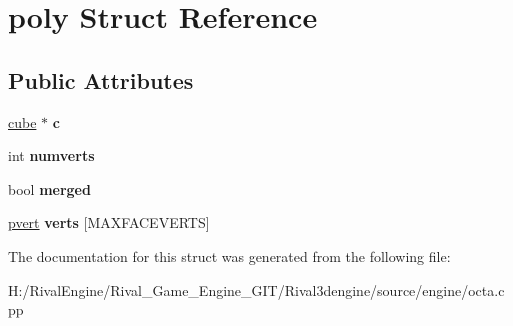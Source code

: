 \hypertarget{structpoly}{}\section{poly Struct Reference}
\label{structpoly}
\subsection*{Public Attributes}
\begin{DoxyCompactItemize}
\item 
\mbox{\label{structpoly_a7509e8ef1a174ba9f856f6c9c8ba434b}} 
\hyperlink{structcube}{cube} $\ast$ {\bfseries c}
\item 
\mbox{\label{structpoly_a4d664289d0ca98193bb3ee07a4394c7f}} 
int {\bfseries numverts}
\item 
\mbox{\label{structpoly_a8abff76cf1cf2d47c0f0f1adfe8484b1}} 
bool {\bfseries merged}
\item 
\mbox{\label{structpoly_ad6c8d6b50a39df917ef46a81a343ec71}} 
\hyperlink{structpvert}{pvert} {\bfseries verts} \mbox{[}M\+A\+X\+F\+A\+C\+E\+V\+E\+R\+TS\mbox{]}
\end{DoxyCompactItemize}


The documentation for this struct was generated from the following file\+:\begin{DoxyCompactItemize}
\item 
H\+:/\+Rival\+Engine/\+Rival\+\_\+\+Game\+\_\+\+Engine\+\_\+\+G\+I\+T/\+Rival3dengine/source/engine/octa.\+cpp\end{DoxyCompactItemize}
